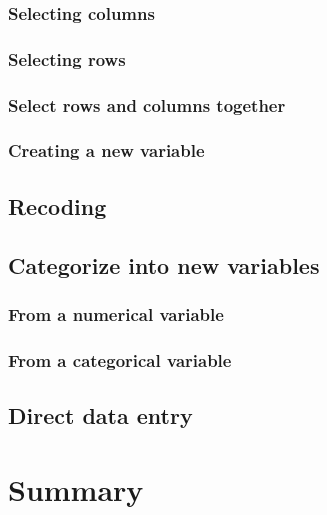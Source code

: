\documentclass[]{book}
\theoremstyle{definition}
\theoremstyle{definition}
\theoremstyle{definition}
\theoremstyle{remark}
\begin{document}
\subsubsection{Selecting columns}\label{selecting-columns}

\subsubsection{Selecting rows}\label{selecting-rows}

\subsubsection{Select rows and columns
together}\label{select-rows-and-columns-together}

\subsubsection{Creating a new variable}\label{creating-a-new-variable}

\subsection{Recoding}\label{recoding}

\subsection{Categorize into new
variables}\label{categorize-into-new-variables}

\subsubsection{From a numerical
variable}\label{from-a-numerical-variable}

\subsubsection{From a categorical
variable}\label{from-a-categorical-variable}

\subsection{Direct data entry}\label{direct-data-entry}

\section{Summary}\label{summary}
\end{document}
